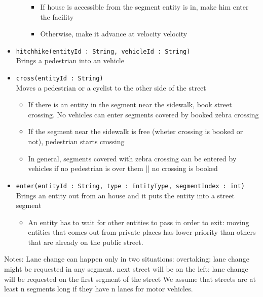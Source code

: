 \begin{itemize}
\begin{itemize}
		\begin{itemize}
			\item If house is accessible from the segment entity is in, make him enter the facility
			\item Otherwise, make it advance at velocity velocity
		\end{itemize}
	\end{itemize}
	\item \texttt{hitchhike(entityId : String, vehicleId : String)}
	\\Brings a pedestrian into an vehicle
	\item \texttt{cross(entityId : String)}
	\\Moves a pedestrian or a cyclist to the other side of the street	
	\begin{itemize}
		\item If there is an entity in the segment near the sidewalk, book street crossing. No vehicles can enter segments covered by booked zebra crossing
		\item If the segment near the sidewalk is free (wheter crossing is booked or not), pedestrian starts crossing
		\item In general, segments covered with zebra crossing can be entered by vehicles if no pedestrian is over them || no crossing is booked
	\end{itemize}
	\item \texttt{enter(entityId : String, type : EntityType, segmentIndex : int)}
	\\Brings an entity out from an house and it puts the entity into a street segment
	\begin{itemize}
		\item An entity has to wait for other entities to pass in order to exit: moving entities that comes out from private places has lower priority than others that are already on the public street.
	\end{itemize}
\end{itemize}
Notes: 
Lane change can happen only in two situations:
overtaking: lane change might be requested in any segment.
next street will be on the left: lane change will be requested on the first segment of the street
We assume that streets are at least n segments long if they have n lanes for motor vehicles.